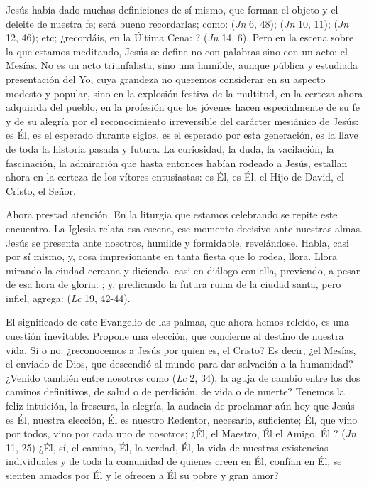 \begin{body}
Jesús había dado muchas definiciones de sí mismo, que forman el objeto y el deleite de nuestra fe; será bueno recordarlas; como:  (\textit{Jn} 6, 48);  (\textit{Jn} 10, 11);  (\textit{Jn} 12, 46); etc; ¿recordáis, en la Última Cena: ? (\textit{Jn} 14, 6). Pero en la escena sobre la que estamos meditando, Jesús se define no con palabras sino con un acto: el Mesías. No es un acto triunfalista, sino una humilde, aunque pública y estudiada presentación del Yo, cuya grandeza no queremos considerar en su aspecto modesto y popular, sino en la explosión festiva de la multitud, en la certeza ahora adquirida del pueblo, en la profesión que los jóvenes hacen especialmente de su fe y de su alegría por el reconocimiento irreversible del carácter mesiánico de Jesús: es Él, es el esperado durante siglos, es el esperado por esta generación, es la llave de toda la historia pasada y futura. La curiosidad, la duda, la vacilación, la fascinación, la admiración que hasta entonces habían rodeado a Jesús, estallan ahora en la certeza de los vítores entusiastas: es Él, es Él, el Hijo de David, el Cristo, el Señor.

Ahora prestad atención. En la liturgia que estamos celebrando se repite este encuentro. La Iglesia relata esa escena, ese momento decisivo ante nuestras almas. Jesús se presenta ante nosotros, humilde y formidable, revelándose. Habla, casi por sí mismo, y, cosa impresionante en tanta fiesta que lo rodea, llora. Llora mirando la ciudad cercana y diciendo, casi en diálogo con ella, previendo, a pesar de esa hora de gloria: ; y, predicando la futura ruina de la ciudad santa, pero infiel, agrega:  (\textit{Lc} 19, 42-44).


El significado de este Evangelio de las palmas, que ahora hemos releído, es una cuestión inevitable. Propone una elección, que concierne al destino de nuestra vida. Sí o no: ¿reconocemos a Jesús por quien es, el Cristo? Es decir, ¿el Mesías, el enviado de Dios, que descendió al mundo para dar salvación a la humanidad? ¿Venido también entre nosotros como  (\textit{Lc} 2, 34), la aguja de cambio entre los dos caminos definitivos, de salud o de perdición, de vida o de muerte? Tenemos la feliz intuición, la frescura, la alegría, la audacia de proclamar aún hoy que Jesús es Él, nuestra elección, Él es nuestro Redentor, necesario, suficiente; Él, que vino por todos, vino por cada uno de nosotros; ¿Él, el Maestro, Él el Amigo, Él ? (\textit{Jn} 11, 25) ¿Él, sí, el camino, Él, la verdad, Él, la vida de nuestras existencias individuales y de toda la comunidad de quienes creen en Él, confían en Él, se sienten amados por Él y le ofrecen a Él su pobre y gran amor?


\end{body}
